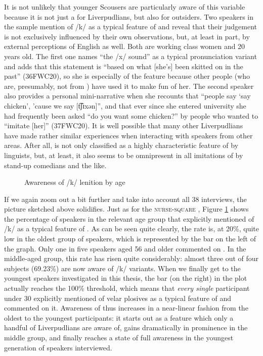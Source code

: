 It is not unlikely that younger Scousers are particularly aware of this variable because it is not just a  for Liverpudlians, but also for outsiders.
Two speakers in the sample mention  of /k/ as a typical feature of  and reveal that their judgement is not exclusively influenced by their own observations, but, at least in part, by external perceptions of  English as well.
Both are working class women and 20 years old.
The first one names ``the /x/ sound'' as a typical  pronunciation variant and adds that this statement is ``based on what [she's] been skitted on in the past'' (36FWC20), so she is especially  of the feature because other people (who are, presumably, not from ) have used it to make fun of her.
The second speaker also provides a personal mini-narrative when she recounts that ``people say `say chicken', 'cause we say [t͡ʃɪxən]'', and that ever since she entered university she had frequently been asked ``do you want some chicken?'' by people who wanted to ``imitate [her]'' (37FWC20).
It is well possible that many other Liverpudlians have made rather similar experiences when interacting with speakers from other areas.
After all,  is not only classified as a highly characteristic feature of  by linguists, but,  at least, it also seems to be omnipresent in all imitations of  by stand-up comedians and the like.

\begin{figure}[h]
	\centering
		\resizebox{.49\linewidth}{!}{} 
	\caption{Awareness of /k/ lenition by age}
	\label{fig.aware.k}
\end{figure}

If we again zoom out a bit further and take into account all 38 interviews, the picture sketched above solidifies.
Just as for the \textsc{nurse}-\textsc{square} , Figure \ref{fig.aware.k} shows the percentage of speakers in the relevant age group that explicitly mentioned  of /k/ as a typical feature of .
As can be seen quite clearly, the rate is, at 20\%, quite low in the oldest group of speakers, which is represented by the bar on the left of the graph.
Only one in five speakers aged 56 and older commented on .
In the middle-aged group, this rate has risen quite considerably: almost three out of four subjects (69.23\%) are now aware of  /k/ variants.
When we finally get to the youngest speakers investigated in this thesis, the bar (on the right) in the plot actually reaches the 100\% threshold, which means that \emph{every single} participant under 30 explicitly mentioned  of velar plosives as a typical feature of  and commented on it.
Awareness of  thus increases in a near-linear fashion from the oldest to the youngest participants: it starts out as a feature which only a handful of Liverpudlians are aware of, gains dramatically in prominence in the middle group, and finally reaches a state of full  awareness in the youngest generation of speakers interviewed.

